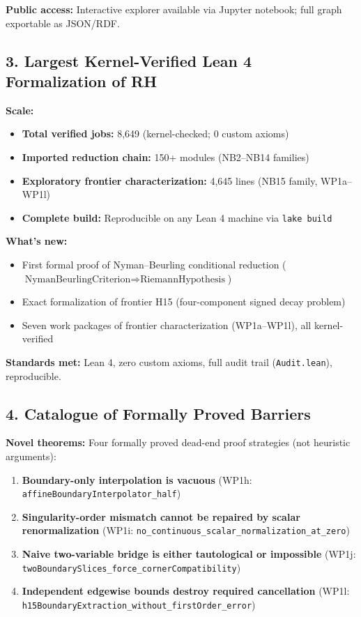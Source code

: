 \documentclass[11pt,a4paper]{article}
\theoremstyle{plain}
\theoremstyle{definition}
\theoremstyle{remark}
\begin{document}
\textbf{Public access:} Interactive explorer available via Jupyter notebook; full graph exportable as JSON/RDF.

\subsection{3. Largest Kernel-Verified Lean 4 Formalization of RH}

\textbf{Scale:}
\begin{itemize}[leftmargin=2em]
  \item \textbf{Total verified jobs:} 8,649 (kernel-checked; 0 custom axioms)
  \item \textbf{Imported reduction chain:} 150+ modules (NB2--NB14 families)
  \item \textbf{Exploratory frontier characterization:} 4,645 lines (NB15 family, WP1a--WP1l)
  \item \textbf{Complete build:} Reproducible on any Lean 4 machine via \texttt{lake build}
\end{itemize}

\textbf{What's new:}
\begin{itemize}[leftmargin=2em]
  \item First formal proof of Nyman--Beurling conditional reduction ($\text{NymanBeurlingCriterion} \Rightarrow \text{RiemannHypothesis}$)
  \item Exact formalization of frontier H15 (four-component signed decay problem)
  \item Seven work packages of frontier characterization (WP1a--WP1l), all kernel-verified
\end{itemize}

\textbf{Standards met:} Lean 4, zero custom axioms, full audit trail (\texttt{Audit.lean}), reproducible.

\subsection{4. Catalogue of Formally Proved Barriers}

\textbf{Novel theorems:} Four formally proved dead-end proof strategies (not heuristic arguments):

\begin{enumerate}[label=\textbf{\arabic*.}]
  \item \textbf{Boundary-only interpolation is vacuous} (WP1h: \texttt{affineBoundaryInterpolator\_half})
  \item \textbf{Singularity-order mismatch cannot be repaired by scalar renormalization} (WP1i: \texttt{no\_continuous\_scalar\_normalization\_at\_zero})
  \item \textbf{Naive two-variable bridge is either tautological or impossible} (WP1j: \texttt{twoBoundarySlices\_force\_cornerCompatibility})
  \item \textbf{Independent edgewise bounds destroy required cancellation} (WP1l: \texttt{h15BoundaryExtraction\_without\_firstOrder\_error})
\end{enumerate}
\end{document}
